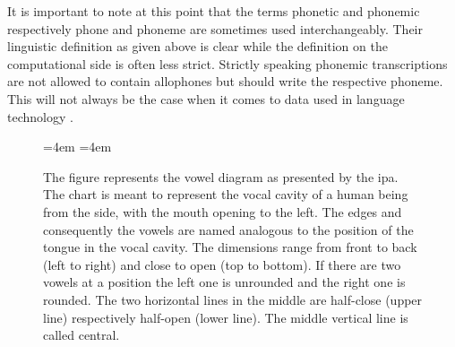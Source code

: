 It is important to note at this point that the terms phonetic and phonemic respectively phone and phoneme are sometimes used interchangeably. Their linguistic definition as given above is clear while the definition on the computational side is often less strict. Strictly speaking phonemic transcriptions are not allowed to contain allophones but should write the respective phoneme. This will not always be the case when it comes to data used in language technology \citep{Lee&Ashby.2020}. 


\begin{figure}[t!]
{\large
\vowelvunit=4em
\vowelhunit=4em
\begin{center}
\begin{vowel}
\end{vowel}
\end{center}}
\caption[Vowel chart]{The figure represents the vowel diagram as presented by the \ac{ipa}. The chart is meant to represent the vocal cavity of a human being from the side, with the mouth opening to the left. The edges and consequently the vowels are named analogous to the position of the tongue in the vocal cavity. The dimensions range from front to back (left to right) and close to open (top to bottom). If there are two vowels at a position the left one is unrounded and the right one is rounded. The two horizontal lines in the middle are half-close (upper line) respectively half-open (lower line). The middle vertical line is called central.}
\label{fig:vowel-diagram}
\end{figure}

